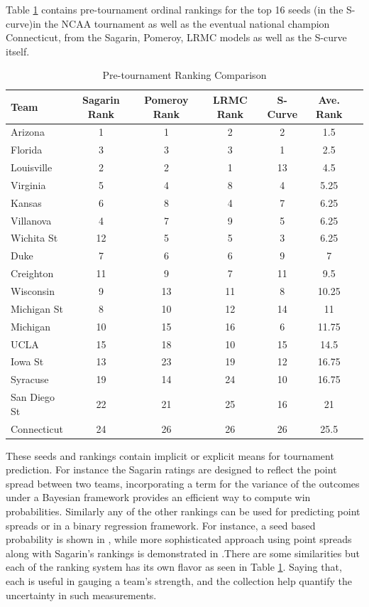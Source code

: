 \documentclass[letterpaper,12pt]{article}
\begin{document}
Table \ref{tab:ranks} contains pre-tournament ordinal rankings for the top 16 seeds (in the S-curve)in the NCAA tournament as well as the eventual national champion Connecticut, from the Sagarin, Pomeroy, LRMC models as well as the S-curve itself.
\begin{table}[h!]
\caption{Pre-tournament Ranking Comparison}
\footnotesize
\centering
\begin{tabular}{l|ccccc|c}
  \hline
  \hline
 Team & Sagarin Rank &  Pomeroy Rank  & LRMC Rank & S-Curve& Ave. Rank  \\ 
  \hline
 Arizona         & 1  &1      & 2 & 2& 1.5  \\
 Florida          & 3  &3      &3 & 1& 2.5\\
 Louisville      & 2  &2      & 1 &13 & 4.5\\
 Virginia         & 5  &4       &8 & 4 &5.25\\
  Kansas         & 6  &8      & 4& 7 &6.25\\
 Villanova      & 4  &7       & 9 & 5 &6.25\\
 Wichita St    & 12 &5          &5 & 3 &6.25\\
 Duke             & 7  &6         &6 &9&7\\
  Creighton &  11 &   9   &7 &11& 9.5\\ 
 Wisconsin  &   9   &13     &  11 & 8 &10.25\\
 Michigan St & 8  &10   & 12& 14&11\\
 Michigan & 10 & 15&  16& 6 &11.75\\
 UCLA & 15& 18& 10 &15 &14.5\\
 Iowa St &13 &23  &19 &12 &16.75 \\
 Syracuse &19 &14   &24 &10 &16.75 \\
 San Diego St&22 &21   &25 &16 &21 \\
  \hline
  Connecticut & 24& 26& 26& 26&25.5\\
  \hline
   \hline
\end{tabular}
\label{tab:ranks}
\end{table}
These seeds and rankings contain implicit or explicit means for tournament prediction. For instance the Sagarin ratings are designed to reflect the point spread between two teams, incorporating a term for the variance of the outcomes under a Bayesian framework provides an efficient way to compute win probabilities. Similarly any of the other rankings can be used for predicting point spreads or in a binary regression framework. For instance, a seed based probability is shown in \cite{schwertman1996},  while more sophisticated approach using point spreads along with Sagarin's rankings is demonstrated in \cite{carlin1996}.There are some similarities but each of the ranking system has its own flavor as seen in Table \ref{tab:ranks}. Saying that, each is useful in gauging a team's strength, and the collection help quantify the uncertainty in such measurements.
\end{document}
